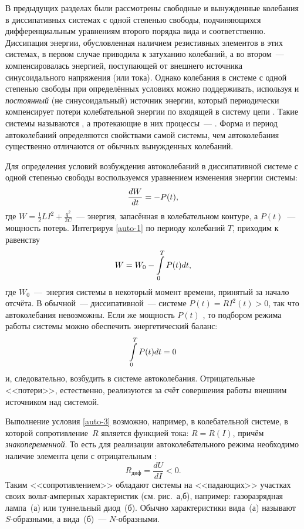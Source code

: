 \label{sec:auto}

В предыдущих разделах были рассмотрены свободные и вынужденные колебания в
диссипативных системах с одной степенью свободы, подчиняющихся дифференциальным
уравнениям второго порядка вида  и 
соответственно. Диссипация энергии, обусловленная наличием резистивных элементов
в этих системах, в первом случае приводила к затуханию колебаний, а во
втором~--- компенсировалась энергией, поступающей от
внешнего источника синусоидального напряжения (или тока). Однако колебания в
системе с одной степенью свободы при определённых условиях можно поддерживать,
используя и \emph{постоянный} (не синусоидальный) источник энергии, 
который периодически компенсирует потери колебательной энергии по входящей 
в систему цепи . 
Такие системы называются , а протекающие в
них процессы~--- . Форма и период автоколебаний
определяются свойствами самой системы, чем автоколебания существенно отличаются
от обычных вынужденных колебаний.

Для определения условий возбуждения автоколебаний в диссипативной системе с
одной степенью свободы воспользуемся уравнением изменения энергии 
системы:
\begin{equation}
	\eqmark{auto-1}
	\frac{dW}{dt}=-P(t),
\end{equation}
где $W=\frac12 LI^2+ \frac{q^2}{2C}$~--- энергия, запасённая в колебательном контуре,
а $P(t)$~--- мощность потерь. 
Интегрируя \eqref{auto-1} по периоду колебаний $T$, приходим 
к равенству
\begin{equation}
	\eqmark{auto-2}
	W=W_0-\int\limits_{0}^{T}P(t)dt,
\end{equation}
где $W_0$~---~энергия системы в некоторый момент времени, принятый за начало
отсчёта. В обычной~--- диссипативной~--- системе $P(t)=RI^{2}(t)>0$, 
так что автоколебания невозможны. 
Если же мощность $P(t)$ , 
то подбором режима работы системы можно обеспечить энергетический баланс:
\begin{equation}
	\eqmark{auto-3}
	\int\limits_{0}^{T} P(t) dt = 0
\end{equation}
и, следовательно, возбудить в системе автоколебания. Отрицательные
<<потери>>, естественно, реализуются за счёт совершения 
работы внешним источником над системой.

Выполнение условия \eqref{auto-3} возможно, например, в 
колебательной системе, в которой сопротивление~$R$ является 
функцией тока: $R=R(I)$, причём \emph{знакопеременной}. То есть для 
реализации автоколебательного режима необходимо наличие
элемента цепи с отрицательным :
\[
R_{диф} = \frac{dU}{dI} < 0.
\]
Таким <<сопротивлением>> обладают системы на <<падающих>> участках своих
вольт-амперных характеристик (см. рис.~а,б), например: 
газоразрядная лампа~(а) или туннельный диод~(б). 
Обычно характеристики вида~(а) называют $S$-образными, 
а вида~(б)~--- $N$-образными.

